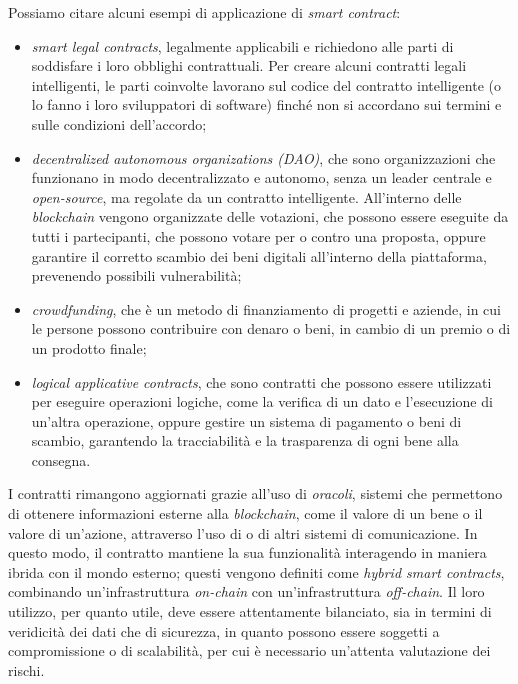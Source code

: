\newpage

Possiamo citare alcuni esempi di applicazione di \textit{smart contract}:
\begin{itemize}
    \item \textit{smart legal contracts}, legalmente applicabili e richiedono alle parti di soddisfare i loro obblighi contrattuali.
    Per creare alcuni contratti legali intelligenti, le parti coinvolte lavorano sul codice del contratto intelligente (o lo fanno i loro sviluppatori di software) finché non si accordano sui termini e sulle condizioni dell'accordo;
    \item \textit{decentralized autonomous organizations (DAO)}, che sono organizzazioni che funzionano in modo decentralizzato e autonomo, senza un leader centrale e \textit{open-source}, ma regolate da un contratto intelligente.
    All'interno delle \textit{blockchain} vengono organizzate delle votazioni, che possono essere eseguite da tutti i partecipanti, che possono votare per o contro una proposta,
    oppure garantire il corretto scambio dei beni digitali all'interno della piattaforma, prevenendo possibili vulnerabilità;
    \item \textit{crowdfunding}, che è un metodo di finanziamento di progetti e aziende, in cui le persone possono contribuire con denaro o beni, in cambio di un premio o di un prodotto finale;
    \item \textit{logical applicative contracts}, che sono contratti che possono essere utilizzati per eseguire operazioni logiche, come la verifica di un dato e l'esecuzione di un'altra operazione,
    oppure gestire un sistema di pagamento o beni di scambio, garantendo la tracciabilità e la trasparenza di ogni bene alla consegna.
\end{itemize}

I contratti rimangono aggiornati grazie all'uso di \textit{oracoli}, sistemi che permettono di ottenere informazioni esterne alla \textit{blockchain}, come il valore di un bene o il valore di un'azione,
attraverso l'uso di  o di altri sistemi di comunicazione. In questo modo, il contratto mantiene la sua funzionalità interagendo in maniera ibrida con il mondo esterno; questi vengono definiti come \textit{hybrid smart contracts}, 
combinando un'infrastruttura \textit{on-chain} con un'infrastruttura \textit{off-chain}.
Il loro utilizzo, per quanto utile, deve essere attentamente bilanciato, sia in termini di veridicità dei dati che di sicurezza, in quanto possono essere soggetti a compromissione o di scalabilità, per cui è necessario
un'attenta valutazione dei rischi.

